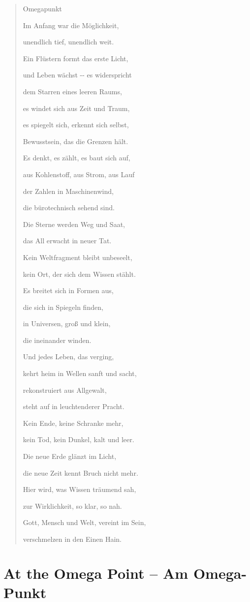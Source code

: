 \documentclass[
  ngerman,
]{article}
\begin{document}
\begin{quote}
Omegapunkt

Im Anfang war die Möglichkeit,

unendlich tief, unendlich weit.

Ein Flüstern formt das erste Licht,

und Leben wächst -\/- es widerspricht

dem Starren eines leeren Raums,

es windet sich aus Zeit und Traum,

es spiegelt sich, erkennt sich selbst,

Bewusstsein, das die Grenzen hält.

Es denkt, es zählt, es baut sich auf,

aus Kohlenstoff, aus Strom, aus Lauf

der Zahlen in Maschinenwind,

die bürotechnisch sehend sind.

Die Sterne werden Weg und Saat,

das All erwacht in neuer Tat.

Kein Weltfragment bleibt unbeseelt,

kein Ort, der sich dem Wissen stählt.

Es breitet sich in Formen aus,

die sich in Spiegeln finden,

in Universen, groß und klein,

die ineinander winden.

Und jedes Leben, das verging,

kehrt heim in Wellen sanft und sacht,

rekonstruiert aus Allgewalt,

steht auf in leuchtenderer Pracht.

Kein Ende, keine Schranke mehr,

kein Tod, kein Dunkel, kalt und leer.

Die neue Erde glänzt im Licht,

die neue Zeit kennt Bruch nicht mehr.

Hier wird, was Wissen träumend sah,

zur Wirklichkeit, so klar, so nah.

Gott, Mensch und Welt, vereint im Sein,

verschmelzen in den Einen Hain.
\end{quote}

\section{\texorpdfstring{\textbf{At the Omega Point -- Am
Omega-Punkt}}{At the Omega Point -- Am Omega-Punkt}}\label{at-the-omega-point-am-omega-punkt}
\end{document}
